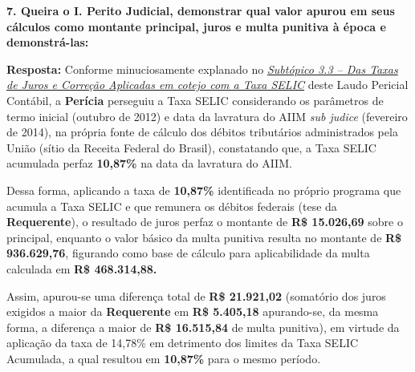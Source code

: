 \textbf{7.	Queira o I. Perito Judicial, demonstrar qual valor apurou em seus cálculos como montante principal, juros e multa punitiva à época e demonstrá-las:}

\textbf{Resposta:}	Conforme minuciosamente explanado no \hyperlink{3.3}{\emph{Subtópico 3.3 – Das Taxas de Juros e Correção Aplicadas em cotejo com a Taxa SELIC}} deste Laudo Pericial Contábil, a \textbf{Perícia} perseguiu a Taxa SELIC considerando os parâmetros de termo inicial (outubro de 2012) e data da lavratura do AIIM \textit{sub judice} (fevereiro de 2014), na própria fonte de cálculo dos débitos tributários administrados pela União (sítio da Receita Federal do Brasil), constatando que, a Taxa SELIC acumulada perfaz \textbf{10,87\%} na data da lavratura do AIIM.

Dessa forma, aplicando a taxa de \textbf{10,87\%} identificada no próprio programa que acumula a Taxa SELIC e que remunera os débitos federais (tese da \textbf{Requerente}), o resultado de juros perfaz o montante de \textbf{R\$ 15.026,69} sobre o principal, enquanto o valor básico da multa punitiva resulta no montante de \textbf{R\$ 936.629,76}, figurando como base de cálculo para aplicabilidade da multa calculada em \textbf{R\$ 468.314,88.}

Assim, apurou-se uma diferença total de \textbf{R\$ 21.921,02}
(somatório dos juros exigidos a maior da \textbf{Requerente} em
\textbf{R\$ 5.405,18} apurando-se, da mesma forma, a diferença a maior de \textbf{R\$ 16.515,84} de multa punitiva), em virtude da aplicação da taxa de 14,78\% em detrimento dos limites da Taxa SELIC Acumulada, a qual resultou em \textbf{10,87\%} para o mesmo período.